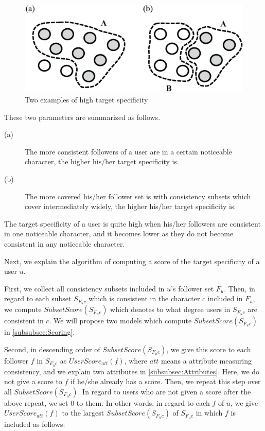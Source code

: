 {\footnotesize
\begin{figure}[t]
\begin{center}
\includegraphics[width=14cm]{images/high_consistency.eps}
 \caption{Two examples of high target specificity}
\label{fig:High Consistency}
\end{center}
\end{figure}
}

These two parameters are summarized as follows.

\begin{description}
\item[(a)] The more consistent followers of a user are in a certain
           noticeable character, the higher his/her target specificity
           is.
\item[(b)] The more covered his/her follower set is with consistency
           subsets which cover intermediately widely, the higher his/her
           target specificity is.
\end{description}

The target specificity of a user is quite high when his/her followers
are consistent in one noticeable character, and it becomes lower as they
do not become consistent in any noticeable character.

Next, we explain the algorithm of computing a score of the target
specificity of a user $u$.

First, we collect all consistency subsets included in $u$'s follower set
$F_u$.  Then, in regard to each subset $S_{F_uc}$ which is consistent in
the character $c$ included in $F_u$, we compute
$\mathit{SubsetScore}(S_{F_uc})$ which denotes to what degree users in
$S_{F_uc}$ are consistent in $c$. We will propose two models which
compute $\mathit{SubsetScore}(S_{F_uc})$ in \ref{subsubsec:Scoring}.

Second, in descending order of $\mathit{SubsetScore}(S_{F_uc})$, we give
this score to each follower $f$ in $S_{F_uc}$ as
$\mathit{UserScore}_{\mathit{att}}(f)$, where $\mathit{att}$ means a
attribute measuring consistency, and we explain two attributes in
\ref{subsubsec:Attributes}. Here, we do not give a score to $f$ if
he/she already has a score. Then, we repeat this step over all
$\mathit{SubsetScore}(S_{F_uc})$.  In regard to users who are not given
a score after the above repeat, we set $0$ to them.  In other words, in
regard to each $f$ of $u$, we give
$\mathit{UserScore}_{\mathit{att}}(f)$ to the largest
$\mathit{SubsetScore}(S_{F_uc})$ of $S_{F_uc}$ in which $f$ is included
as follows:

